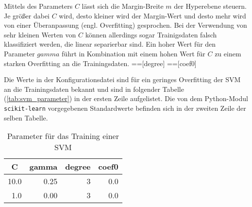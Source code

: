 Mittels des Parameters $C$ lässt sich die Margin-Breite $m$ der Hyperebene steuern.
Je größer dabei $C$ wird, desto kleiner wird der Margin-Wert und desto mehr wird von einer Überanpassung (engl. Overfitting) gesprochen.
Bei der Verwendung von sehr kleinen Werten von $C$ können allerdings sogar Trainigsdaten falsch klassifiziert werden, die linear separierbar sind.
Ein hoher Wert für den Parameter $gamma$ führt in Kombination mit einem hohen Wert für $C$ zu einem starken Overfitting an die Trainingsdaten.
==[degree]
==[coef0]

Die Werte in der Konfigurationsdatei sind für ein geringes Overfitting der \ac{SVM} an die Trainingsdaten bekannt und sind in folgender Tabelle (\autoref{tab:svm_parameter}) in der ersten Zeile aufgelistet.
Die von dem Python-Modul \texttt{scikit-learn} vorgegebenen Standardwerte befinden sich in der zweiten Zeile der selben Tabelle.
\begin{table}[h]
\centering
\begin{tabular}{rrrr}
\hline
  \multicolumn{1}{c}{\textbf{C}} & \multicolumn{1}{c}{\textbf{gamma}} & \multicolumn{1}{c}{\textbf{degree}} & \multicolumn{1}{c}{\textbf{coef0}} \\
 \hline
  10.0 & 0.25 & 3 & 0.0 \\
\hline
1.0 & 0.00 & 3 & 0.0 \\
 \hline
\end{tabular}
\caption[Parameter für das Training einer SVM]{Parameter für das Training einer SVM}
\label{tab:svm_parameter}
\end{table}

